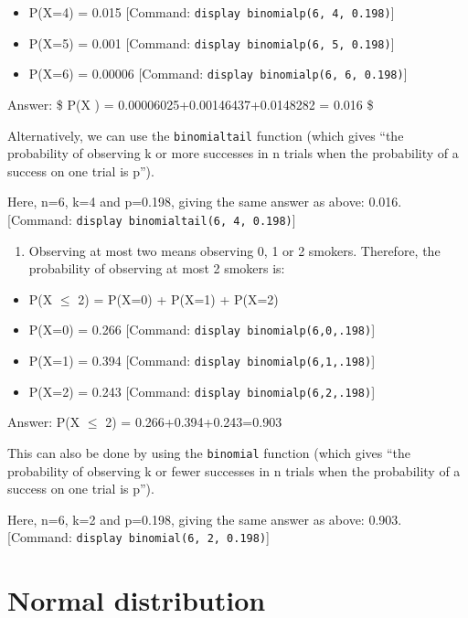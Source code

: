 \documentclass[
]{memoir}
\providecommand{\tightlist}{%
  \setlength{\itemsep}{0pt}\setlength{\parskip}{0pt}}
\begin{document}
\begin{itemize}
\tightlist
\item
  P(X=4) = 0.015 {[}Command: \texttt{display\ binomialp(6,\ 4,\ 0.198)}{]}
\item
  P(X=5) = 0.001 {[}Command: \texttt{display\ binomialp(6,\ 5,\ 0.198)}{]}
\item
  P(X=6) = 0.00006 {[}Command: \texttt{display\ binomialp(6,\ 6,\ 0.198)}{]}
\end{itemize}

Answer: \$ P(X ) = 0.00006025+0.00146437+0.0148282 = 0.016 \$

Alternatively, we can use the \texttt{binomialtail} function (which gives ``the probability of observing k or more successes in n trials when the probability of a success on one trial is p'').

Here, n=6, k=4 and p=0.198, giving the same answer as above: 0.016.
{[}Command: \texttt{display\ binomialtail(6,\ 4,\ 0.198)}{]}

\begin{enumerate}
\def\labelenumi{\alph{enumi})}
\setcounter{enumi}{2}
\tightlist
\item
  Observing at most two means observing 0, 1 or 2 smokers. Therefore, the probability of observing at most 2 smokers is:
\end{enumerate}

\begin{itemize}
\tightlist
\item
  P(X \(\le\) 2) = P(X=0) + P(X=1) + P(X=2)
\item
  P(X=0) = 0.266 {[}Command: \texttt{display\ binomialp(6,0,.198)}{]}
\item
  P(X=1) = 0.394 {[}Command: \texttt{display\ binomialp(6,1,.198)}{]}
\item
  P(X=2) = 0.243 {[}Command: \texttt{display\ binomialp(6,2,.198)}{]}
\end{itemize}

Answer: P(X \(\le\) 2) = 0.266+0.394+0.243=0.903

This can also be done by using the \texttt{binomial} function (which gives ``the probability of observing k or fewer successes in n trials when the probability of a success on one trial is p'').

Here, n=6, k=2 and p=0.198, giving the same answer as above: 0.903.
{[}Command: \texttt{display\ binomial(6,\ 2,\ 0.198)}{]}

\hypertarget{normal-distribution}{%
\section{Normal distribution}\label{normal-distribution}}
\end{document}
